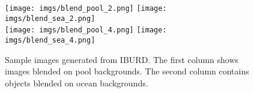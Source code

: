 \begin{figure}[t]

  \centering
  \texttt{[image: imgs/blend\_pool\_2.png]}
  \hspace{2mm}
  \texttt{[image: imgs/blend\_sea\_2.png]}\\
  \vspace{2mm}
  \texttt{[image: imgs/blend\_pool\_4.png]}
  \hspace{2mm}
  \texttt{[image: imgs/blend\_sea\_4.png]}
  \caption{Sample images generated from IBURD. The first column shows images blended on pool backgrounds. The second column contains objects blended on ocean backgrounds.}
  \label{blend_example}
\end{figure}

